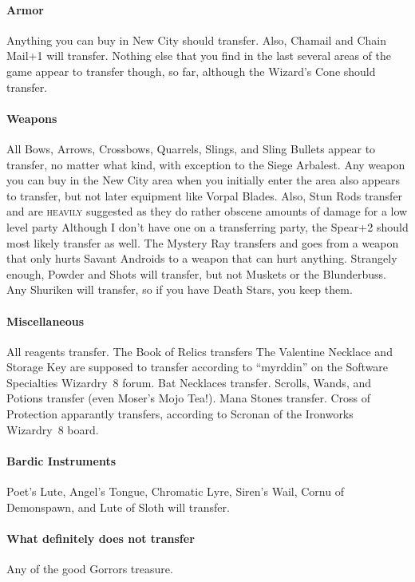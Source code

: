 \documentclass[12pt]{article}
\let\oldparagraph\paragraph
\renewcommand{\paragraph}[1]{\oldparagraph{#1}\mbox{}}
\newcommand{\indexPlace}[1]{\index{#1}}
\newcommand{\place}[1]{#1\indexPlace{#1}}
\newcommand\textlcsc[1]{\texorpdfstring{\textsc{\MakeLowercase{#1}}}{#1}}
\begin{document}
\paragraph{Armor} Anything you can buy in \place{New City} should transfer.
Also, Chamail and Chain Mail+1 will transfer.  Nothing else that you find in
the last several areas of the game appear to transfer though, so far,
although the Wizard's Cone should transfer.

\paragraph{Weapons} All Bows, Arrows, Crossbows, Quarrels, Slings, and Sling
Bullets appear to transfer, no matter what kind, with exception to the Siege
Arbalest.  Any weapon you can buy in the \place{New City} area when you
initially enter the area also appears to transfer, but not later equipment
like Vorpal Blades.  Also, Stun Rods transfer and are \textlcsc{HEAVILY}
suggested as they do rather obscene amounts of damage for a low level party
Although I don't have one on a transferring party, the Spear+2 should most
likely transfer as well.  The Mystery Ray transfers and goes from a weapon
that only hurts Savant Androids to a weapon that can hurt anything.
Strangely enough, Powder and Shots will transfer, but not Muskets or the
Blunderbuss.  Any Shuriken will transfer, so if you have Death Stars, you
keep them.

\paragraph{Miscellaneous} All reagents transfer.  The Book of Relics
transfers The Valentine Necklace and Storage Key are supposed to transfer
according to “myrddin” on the Software Specialties Wizardry~8 forum.  Bat
Necklaces transfer.  Scrolls, Wands, and Potions transfer (even Moser's Mojo
Tea!).  Mana Stones transfer.  Cross of Protection apparantly transfers,
according to Scronan of the Ironworks Wizardry~8 board.

\paragraph{Bardic Instruments} Poet's Lute, Angel's Tongue, Chromatic Lyre,
Siren's Wail, Cornu of Demonspawn, and Lute of Sloth will transfer.

\paragraph{What definitely does not transfer} Any of the good Gorrors
treasure.
\end{document}
